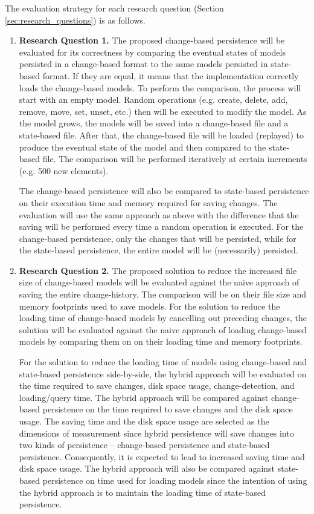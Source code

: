 \documentclass[12pt, a4paper]{report} \usepackage[titletoc]{appendix}
\begin{document}
The evaluation strategy for each research question (Section \ref{sec:research_questions}) is as follows. 
\begin{enumerate}
    \item \textbf{Research Question 1.} The proposed change-based persistence will be evaluated for its correctness by comparing the eventual states of models persisted in a change-based format to the same models persisted in state-based format. If they are equal, it means that the implementation correctly loads the change-based models. To perform the comparison, the process will start with an empty model. Random operations (e.g. create, delete, add, remove, move, set, unset, etc.) then will be executed to modify the model. As the model grows, the models will be saved into a change-based file and a state-based file. After that, the change-based file will be loaded (replayed) to produce the eventual state of the model and then compared to the state-based file. The comparison will be performed iteratively at certain increments (e.g. 500 new elements). 
    
    The change-based persistence will also be compared to state-based persistence on their execution time and memory required for saving changes. The evaluation will use the same approach as above with the difference that the saving will be performed every time a random operation is executed. For the change-based persistence, only the changes that will be persisted, while for the state-based persistence, the entire model will be (necessarily) persisted.
    
    \item \textbf{Research Question 2.} The proposed solution to reduce the increased file size of change-based models will be evaluated against the naive approach of saving the entire change-history. The comparison will be on their file size and memory footprints used to save models. For the solution to reduce the loading time of change-based models by cancelling out preceding changes, the solution will be evaluated against the naive approach of loading change-based models by comparing them on on their loading time and memory footprints.  
    
     For the solution to reduce the loading time of models using change-based and state-based persistence side-by-side,  the hybrid approach will be evaluated on the time required to save changes, disk space usage, change-detection, and loading/query time. The hybrid approach will be compared against change-based persistence on the time required to save changes and the disk space usage. The saving time and the disk space usage are selected as the dimensions of measurement since hybrid persistence will save changes into two kinds of persistence -- change-based persistence and state-based persistence. Consequently, it is expected to lead to increased saving time and disk space usage. The hybrid approach will also be compared against state-based persistence on time used for loading models since the intention of using the hybrid approach is to maintain the loading time of state-based persistence. 
    

\end{enumerate}
\end{document}
